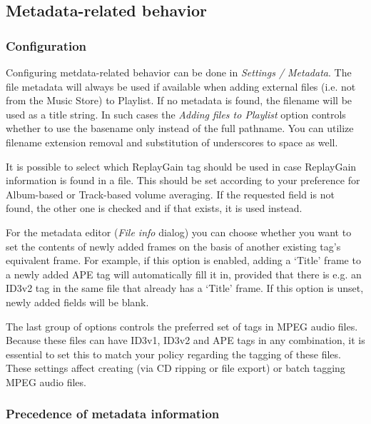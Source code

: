 \documentclass[10pt,english]{article}
\begin{document}
\subsection{Metadata-related behavior\label{idp706768}}

\subsubsection{Configuration\label{idp707312}}



\noindent Configuring metdata-related behavior can be done in
\textsl{Settings / Metadata}. The file metadata will
always be used if available when adding external files
(i.e. not from the Music Store) to Playlist. If no metadata
is found, the filename will be used as a title string. In
such cases the \textsl{Adding files to Playlist} option
controls whether to use the basename only instead of the
full pathname. You can utilize filename extension removal
and substitution of underscores to space as well.




It is possible to select which ReplayGain tag should be
used in case ReplayGain information is found in a file. This
should be set according to your preference for Album-based
or Track-based volume averaging. If the requested field is
not found, the other one is checked and if that exists, it
is used instead.




For the metadata editor (\textsl{File info} dialog) you
can choose whether you want to set the contents of newly
added frames on the basis of another existing tag's
equivalent frame. For example, if this option is enabled,
adding a `Title' frame to a newly added APE tag will
automatically fill it in, provided that there is e.g. an
ID3v2 tag in the same file that already has a `Title'
frame. If this option is unset, newly added fields will be
blank.




The last group of options controls the preferred set of
tags in MPEG audio files. Because these files can have
ID3v1, ID3v2 and APE tags in any combination, it is
essential to set this to match your policy regarding the
tagging of these files. These settings affect creating (via
CD ripping or file export) or batch tagging MPEG audio
files.




\subsubsection{Precedence of metadata information\label{idp713952}}
\end{document}
